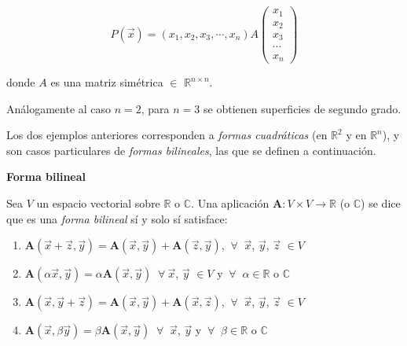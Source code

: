 \begin{equation}
\label{fcuadratica01Rn}
P(\vec{x})=(x_1, x_2, x_3, \cdots, x_n)A \left(\begin{array}{c}  x_{1} \\  x_{2}  
\\  x_3 \\ \cdots \\  x_{n} 
\end{array}\right)
\end{equation}

\bigskip

\bigskip

\noindent
donde  $A$ es una matriz  simétrica $\in$ $\mathbb{R}^{n \times n}.$

\noindent
Análogamente al caso $n=2$, para $n=3$ se obtienen superficies de segundo grado.

\bigskip

Los dos ejemplos anteriores corresponden a   \textit{formas cuadráticas} (en $\mathbb{R}^{2}$ y en  $\mathbb{R}^{n}$), y son casos particulares de \textit{formas bilineales}, las que se definen a continuación.

\bigskip

\begin{definition}\textbf{Forma bilineal}


Sea $V$ un espacio vectorial sobre $\mathbb{R}$ o $\mathbb{C}$. Una aplicación $\mathbf{A}:  V \times V\rightarrow \mathbb{R}$ (o $\mathbb{C}$) se dice que es una \textit{forma bilineal} sí y solo sí satisface:

\bigskip

\begin{enumerate}



\item  

$\mathbf{A}(\vec{x}+\vec{z},\vec{y}   )=\mathbf{A}(\vec{x},\vec{y}) + \mathbf{A}(\vec{z},\vec{y})$, $~ \forall~$  $\vec{x}$, $\vec{y}$, $\vec{z} $ $\in V$
\bigskip


\item $\mathbf{A}(\alpha\vec{x},\vec{y})=\alpha \mathbf{A} (\vec{x},\vec{y})$ $~ \forall~$$\vec{x}$, $\vec{y}$ $\in V$ y $~ \forall~$ $\alpha \in \mathbb{R} $ o $\mathbb{C}$

\bigskip


\item $\mathbf{A}(\vec{x},\vec{y} +\vec{z}  )=\mathbf{A}(\vec{x},\vec{y}) + \mathbf{A}(\vec{x},\vec{z})$, $~ \forall~$ $\vec{x}$, $\vec{y}$, $\vec{z} $ $\in V$

\bigskip


\item  $\mathbf{A}(\vec{x},\beta \vec{y})= \beta \mathbf{A}(\vec{x}, \vec{y})$ $~ \forall~$ $\vec{x}$, $\vec{y}$ y $~ \forall~$ $\beta \in \mathbb{R} $ o $\mathbb{C}$

\end{enumerate}


\end{definition}

